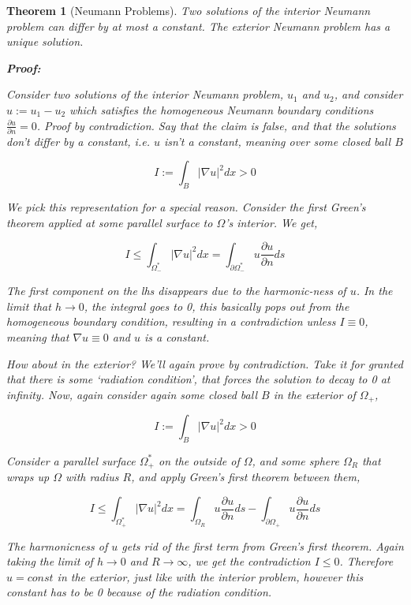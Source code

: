 \documentclass[12pt, a4, twoside]{article}
\newtheorem{theorem}{Theorem}[section]
\begin{document}
\begin{theorem}[Neumann Problems]
    Two solutions of the interior Neumann problem can differ by at most a constant. The exterior Neumann problem has a unique solution.

    \textbf{Proof:}

    Consider two solutions of the interior Neumann problem, $u_1$ and $u_2$, and consider $u := u_1 - u_2$ which satisfies the homogeneous Neumann boundary conditions $\frac{\partial u}{\partial n} = 0$. Proof by contradiction. Say that the claim is false, and that the solutions don't differ by a constant, i.e. $u$ isn't a constant, meaning over some closed ball $B$

    $$ I := \int_B |\nabla u|^2 dx > 0  $$

    We pick this representation for a special reason. Consider the first Green's theorem applied at some parallel surface to $\Omega$'s interior. We get,

    $$I \leq \int_{\Omega^*_-} |\nabla u|^2 dx= \int_{\partial \Omega^*_-} u \frac{\partial u}{\partial n} ds$$

    The first component on the lhs disappears due to the harmonic-ness of $u$. In the limit that $h \rightarrow 0$, the integral goes to 0, this basically pops out from the homogeneous boundary condition, resulting in a contradiction unless $I \equiv 0$, meaning that $\nabla u \equiv 0$ and $u$ is a constant.

    How about in the exterior? We'll again prove by contradiction. Take it for granted that there is some `radiation condition', that forces the solution to decay to 0 at infinity. Now, again consider again some closed ball $B$ in the exterior of $\Omega_+$,
    
    $$ I := \int_B |\nabla u|^2 dx > 0$$
    

    Consider a parallel surface $\Omega^*_+$ on the outside of $\Omega$, and some sphere $\Omega_R$ that wraps up $\Omega$ with radius $R$, and apply Green's first theorem between them,

    $$ I \leq \int_{\Omega^*_+} |\nabla u|^2 dx = \int_{\Omega_R} u \frac{\partial u}{\partial n} ds - \int_{\partial \Omega_+} u \frac{\partial u}{\partial n} ds $$

    The harmonicness of $u$ gets rid of the first term from Green's first theorem. Again taking the limit of $h \rightarrow 0$ and $R \rightarrow \infty$, we get the contradiction $I \leq 0$. Therefore $u = const$ in the exterior, just like with the interior problem, however this constant has to be 0 because of the radiation condition.

\end{theorem}
\end{document}

